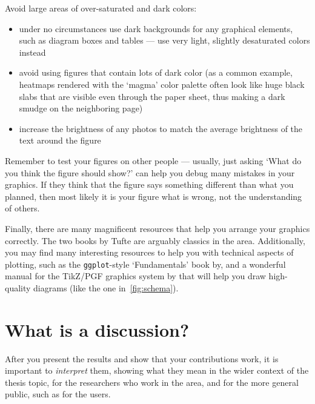 Avoid large areas of over-saturated and dark colors:
\begin{itemize}
  \item under no circumstances use dark backgrounds for any graphical elements, such as diagram boxes and tables --- use very light, slightly desaturated colors instead
  \item avoid using figures that contain lots of dark color (as a common example, heatmaps rendered with the `magma' color palette often look like huge black slabs that are visible even through the paper sheet, thus making a dark smudge on the neighboring page)
  \item increase the brightness of any photos to match the average brightness of the text around the figure
\end{itemize}

Remember to test your figures on other people --- usually, just asking `What do you think the figure should show?' can help you debug many mistakes in your graphics. If they think that the figure says something different than what you planned, then most likely it is your figure what is wrong, not the understanding of others.

Finally, there are many magnificent resources that help you arrange your graphics correctly. The two books by Tufte are arguably classics in the area. Additionally, you may find many interesting resources to help you with technical aspects of plotting, such as the \texttt{ggplot}-style `Fundamentals' book by, and a wonderful manual for the TikZ/PGF graphics system by that will help you draw high-quality diagrams (like the one in~\cref{fig:schema}).

\section{What is a discussion?}
After you present the results and show that your contributions work, it is important to \emph{interpret} them, showing what they mean in the wider context of the thesis topic, for the researchers who work in the area, and for the more general public, such as for the users.

